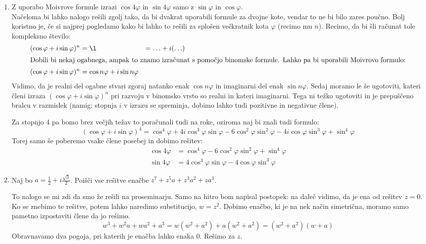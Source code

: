\documentclass[12pt,a4paper,slovene]{article}
\begin{document}
\begin{enumerate}[(1)]
    
    \item Z uporabo Moivrove formule izrazi $\cos 4\varphi$ in $\sin 4\varphi$ samo z $\sin \varphi$ in $\cos \varphi$.\\
    Načeloma bi lahko nalogo rešili zgolj tako, da bi dvakrat uporabili formule za dvojne kote, vendar to ne bi bilo zares poučno. Bolj koristno je, če si najprej pogledamo kako bi lahko to rešili za splošen večkratnik kota $\varphi$ (recimo mu $n$).
    Recimo, da bi šli računat tole kompleksno število:
    \begin{align*}
        (\cos \varphi + i \sin \varphi)^n &= \l &= \ldots  + i(\ldots)\\
        \intertext{Dobili bi nekaj ogabnega, ampak to znamo izračunat s pomočjo binomske formule. Lahko pa bi uporabili Moivrovo formulo:}
        (\cos \varphi + i \sin \varphi)^n &= \cos n\varphi + i \sin n \varphi
    \end{align*}
    Vidimo, da je realni del ogabne stvari zgoraj natanko enak $\cos n \varphi$ in imaginarni del enak $\sin n \varphi$. Sedaj moramo le še ugotoviti, kateri členi izraza $(\cos \varphi + i \sin \varphi)^n$ pri razvoju v binomsko vrsto so realni in kateri imaginarni. Tega ni težko ugotoviti in je prepuščeno bralcu v razmislek (namig: stopnja $i$ v izrazu se spreminja, dobimo lahko tudi pozitivne in negativne člene).
    
    Za stopnjo 4 pa bomo brez večjih težav to poračunali tudi na roke, oziroma naj bi znali tudi formulo:
    \[
    (\cos \varphi + i \sin \varphi)^4 = \cos^4 \varphi + 4i \cos^3 \varphi \sin \varphi - 6 \cos^2 \varphi \sin^2 \varphi - 4i \cos \varphi \sin^3 \varphi + \sin^4 \varphi
    \]
    Torej samo še poberemo vsake člene posebej in dobimo rešitev:
    \begin{align*}
    \cos 4 \varphi &= \cos^4 \varphi - 6 \cos^2 \varphi \sin^2 \varphi + \sin^4 \varphi\\
    \sin 4 \varphi &= 4\cos^3 \varphi \sin \varphi - 4 \cos \varphi \sin^3 \varphi
    \end{align*}

    \item Naj bo $a = \frac{1}{2} + i \frac{\sqrt{3}}{2}$. Poišči vse rešitve enačbe $z^7 + z^5a + z^3a^2 + za^3$.
    
    To nalogo se mi zdi da smo že rešili na proseminarju. Samo na hitro bom napisal postopek: na daleč vidimo, da je ena od rešitev $z = 0$. Ko se znebimo te rešitve, potem lahko naredimo substitucijo, $w = z^2$. Dobimo enačbo, ki je na nek način simetrična, moramo samo pametno izpostaviti člene da jo rešimo.
    \[
    w^3 + w^2a + wa^2 + a^3 = w(w^2 + a^2) + a(w^2 + a^2) = (w^2 + a^2)(w + a) 
    \]
    Obravnavamo dva pogoja, pri katerih je enačba lahko enaka 0. Rešimo za $z$.
     

\end{enumerate}
\end{document}
